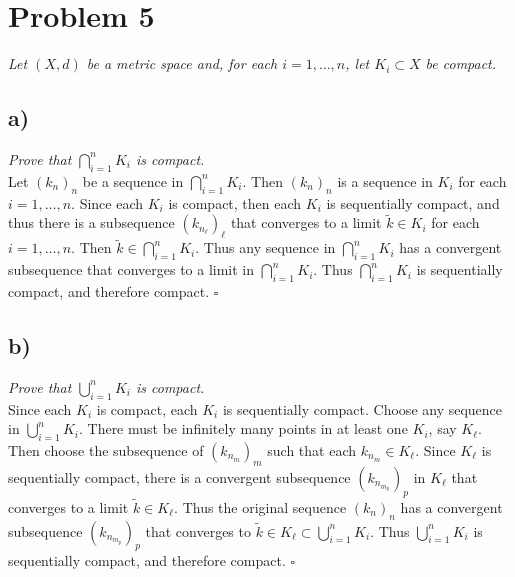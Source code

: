 \documentclass[12pt]{article}
\begin{document}

\section*{Problem 5}
{\it Let $(X,d)$ be a metric space and, for each $i = 1, \dots, n$, let $K_i \subset X$ be compact.}

\subsection*{ a)}
{\it Prove that $\bigcap_{i=1}^{n}K_i$ is compact.} \\

Let $(k_n)_n$ be a sequence in $\bigcap_{i=1}^n K_i$.  Then $(k_n)_n$ is a sequence in $K_i$ for each $i = 1, \dots, n$.  Since each $K_i$ is compact, then each $K_i$ is sequentially compact, and thus there is a subsequence $(k_{n_\ell})_\ell$ that converges to a limit $\tilde{k} \in K_i$ for each $i = 1, \dots, n$.  Then $\tilde{k} \in \bigcap_{i=1}^n K_i$.  Thus any sequence in $\bigcap_{i=1}^n K_i$ has a convergent subsequence that converges to a limit in $\bigcap_{i=1}^n K_i$.  Thus $\bigcap_{i=1}^n K_i$ is sequentially compact, and therefore compact. \hfill $\square$

\subsection*{ b)}
{\it Prove that $\bigcup_{i=1}^{n}K_i$ is compact.} \\

Since each $K_i$ is compact, each $K_i$ is sequentially compact.  Choose any sequence in $\bigcup_{i=1}^n K_i$.  There must be infinitely many points in at least one $K_i$, say $K_\ell$.  Then choose the subsequence of $(k_{n_m})_m$ such that each $k_{n_m} \in K_\ell$.  Since $K_\ell$ is sequentially compact, there is a convergent subsequence $(k_{n_{m_p}})_p$ in $K_\ell$ that converges to a limit $\tilde{k} \in K_\ell$.  Thus the original sequence $(k_n)_n$ has a convergent subsequence $(k_{n_{m_p}})_p$ that converges to $\tilde{k} \in K_\ell \subset \bigcup_{i=1}^{n}K_i$.  Thus $\bigcup_{i=1}^{n}K_i$ is sequentially compact, and therefore compact. \hfill $\square$
\end{document}
